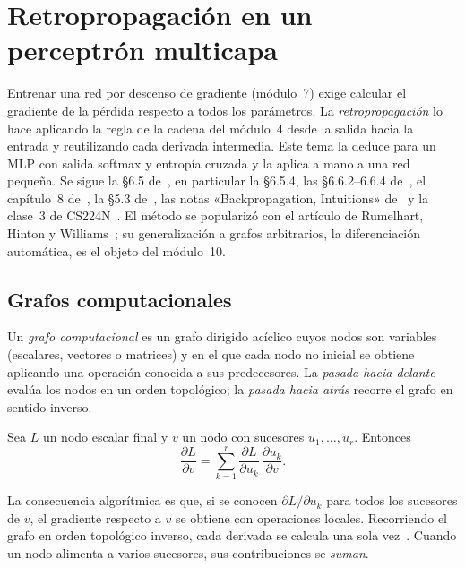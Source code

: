 \chapter{Retropropagación en un perceptrón multicapa}
\label{tema:5}

Entrenar una red por descenso de gradiente (módulo~7) exige calcular el gradiente de la pérdida respecto a todos los parámetros. La \emph{retropropagación} lo hace aplicando la regla de la cadena del módulo~4 desde la salida hacia la entrada y reutilizando cada derivada intermedia. Este tema la deduce para un MLP con salida softmax y entropía cruzada y la aplica a mano a una red pequeña. Se sigue la §6.5 de~\cite{gbc}, en particular la §6.5.4, las §6.6.2--6.6.4 de~\cite{jm3}, el capítulo~8 de~\cite{bishopdl}, la §5.3 de~\cite{d2l}, las notas «Backpropagation, Intuitions» de~\cite{cs231n} y la clase~3 de CS224N~\cite{cs224n}. El método se popularizó con el artículo de Rumelhart, Hinton y Williams~\cite{rumelhart}; su generalización a grafos arbitrarios, la diferenciación automática, es el objeto del módulo~10.

\section{Grafos computacionales}

\begin{definicion}
Un \emph{grafo computacional} es un grafo dirigido acíclico cuyos nodos son variables (escalares, vectores o matrices) y en el que cada nodo no inicial se obtiene aplicando una operación conocida a sus predecesores. La \emph{pasada hacia delante} evalúa los nodos en un orden topológico; la \emph{pasada hacia atrás} recorre el grafo en sentido inverso.
\end{definicion}

\begin{proposicion}\label{prop:cadena-grafo}
Sea $L$ un nodo escalar final y $v$ un nodo con sucesores $u_1,\dots,u_r$. Entonces
\[
\frac{\partial L}{\partial v}=\sum_{k=1}^{r}\frac{\partial L}{\partial u_k}\,\frac{\partial u_k}{\partial v}.
\]
\end{proposicion}

La consecuencia algorítmica es que, si se conocen $\partial L/\partial u_k$ para todos los sucesores de $v$, el gradiente respecto a $v$ se obtiene con operaciones locales. Recorriendo el grafo en orden topológico inverso, cada derivada se calcula una sola vez~\cite[§6.5.3]{gbc}. Cuando un nodo alimenta a varios sucesores, sus contribuciones se \emph{suman}.

